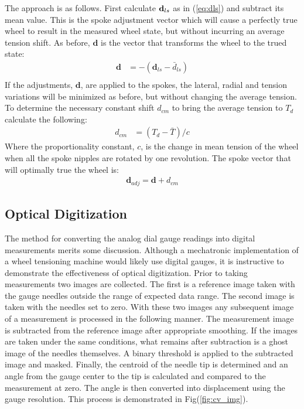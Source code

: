 \documentclass[journal]{IEEEtran}
\begin{document}
The approach is as follows.  First calculate ${\bf d}_{ls}$ as in (\ref{eq:dls}) and subtract its mean value.  This is the spoke adjustment vector which will cause a perfectly true wheel to result in the measured wheel state, but without incurring an average tension shift. As before, $\mathbf {d}$ is the vector that transforms the wheel to the trued state:
\begin{align*}
    \mathbf{d} &= -(\mathbf{d}_{ls} - \bar d_{ls})\\
\end{align*}
If the adjustments, $\mathbf {d}$, are applied to the spokes, the lateral, radial and tension variations will be minimized as before, but without changing the average tension.  To determine the necessary constant shift $d_{cm}$ to bring the average tension to $T_d$ calculate the following:
\begin{align*}
    d_{cm} &=  (T_d - \bar T)/c
\end{align*}
Where the proportionality constant, $c$, is the change in mean tension of the wheel when all the spoke nipples are rotated by one revolution. The spoke vector that will optimally true the wheel is:
\begin{align}
    \mathbf{d}_{adj} =\mathbf{d}  + d_{cm} 
\end{align}

\subsection{Optical Digitization}
The method for converting the analog dial gauge readings into digital measurements merits some discussion.  Although a mechatronic implementation of a wheel tensioning machine would likely use digital gauges, it is instructive to demonstrate the effectiveness of optical digitization.  Prior to taking measurements two  images are collected.  The first is a reference image taken with the gauge needles outside the range of expected data range.  The second image is taken with the needles set to zero.  With these two images any subsequent image of a measurement is processed in the following manner.  The measurement image is subtracted from the reference image after appropriate smoothing.  If the images are taken under the same conditions, what remains after subtraction is a ghost image of the needles themselves. A binary threshold is applied to the subtracted image and masked.  Finally, the centroid of the needle tip is determined and an angle from the gauge center to the tip is calculated and compared to the measurement at zero.  The angle is then converted into displacement using the gauge resolution. This process is demonstrated in Fig(\ref{fig:cv_img}).  
\end{document}

